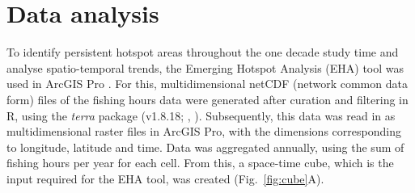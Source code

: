 \section{Data analysis}
To identify persistent hotspot areas throughout the one decade study time and analyse
spatio-temporal trends, the Emerging Hotspot Analysis (EHA) tool was used in ArcGIS Pro
\citep{arcgis}. For this, multidimensional netCDF (network common data form) files of the fishing
hours data were generated after curation and filtering in R, using the \textit{terra} package
(v1.8.18; \citeauthor{terra_package}, \citeyear{terra_package}). Subsequently, this data was read
in as multidimensional raster files in ArcGIS Pro, with the dimensions corresponding to longitude,
latitude and time. Data was aggregated annually, using the sum of fishing hours per year for each
cell. From this, a space-time cube, which is the input required for the EHA tool, was created
(Fig.~\ref{fig:cube}A).

